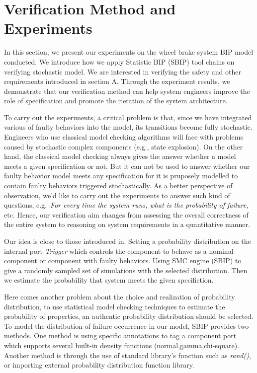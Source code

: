 

\section{Verification Method and Experiments}

In this section, we present our experiments on the wheel brake system BIP model conducted. We introduce how we apply Statistic BIP (SBIP) tool chains on verifying stochastic model. We are interested in verifying the safety and other requirements introduced in section A. Through the experiment results, we demonstrate that our verification method can help system engineers improve the role of specification and promote the iteration of the system architecture.

To carry out the experiments, a critical problem is that, since we have integrated various of faulty behaviors into the model, its transitions become fully stochastic. Engineers who use classical model checking algorithms will face with problems caused by stochastic complex components (e.g., state explosion). On the other hand, the classical model checking always gives the answer whether a model meets a given specification or not. But it can not be used to answer whether our faulty behavior model meets any specification for it is pruposely modelled to contain faulty behaviors triggered stochastically. As a better perspective of observation, we'd like to carry out the experiments to answer such kind of questions, e.g.\ \emph{For every time the system runs, what is the probability of failure,} etc. Hence, our verification aim changes from assessing the overall correctness of the entire system to reasoning on system requirements in a quantitative manner.

Our idea is close to those introduced in\cite{smc10,smc10'}. Setting a probability distribution on the internal port \emph{Trigger} which controls the component to behave as a nominal component or component with faulty behaviors. Using SMC engine (SBIP) to give a randomly sampled set of simulations with the selected distribution. Then we estimate the probability that system meets the given specifiction. 

Here comes another problem about the choice and realization of probability distribution, to use statistical model checking techniques to estimate the probability of properties, an authentic probability distribution should be selected. To model the distribution of failure occurrence in our model, SBIP provides two methods. One method is using specific annotations to tag a component port which supports several built-in density functions (normal,gamma,chi-square). Another method is through the use of standard library's function such as \emph{rand()}, or importing external probability distribution function library.

